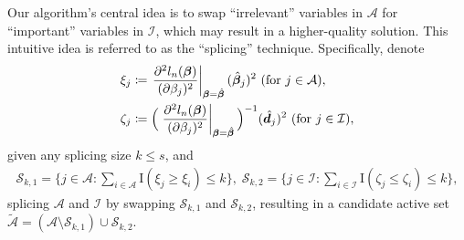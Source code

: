 Our algorithm's central idea is to swap ``irrelevant'' variables in $\mathcal{A}$ for
``important'' variables in $\mathcal{I}$, which may result in a higher-quality solution.
This intuitive idea is referred to as the ``splicing'' technique. Specifically, denote
\begin{equation}\label{eqn:approx_sacrifice}
\begin{split}
\xi_j & \coloneqq \left.\frac{\partial^2 l_n( \boldsymbol \beta )}{ (\partial \beta_{j})^2 }\right|_{\boldsymbol \beta = \hat{\boldsymbol \beta}} (\hat {\boldsymbol \beta}_j)^2 ~(\textup{for}~ j \in \mathcal{A}), \\
\zeta_j & \coloneqq \Big( \left.\frac{\partial^2 l_n( \boldsymbol \beta )}{ (\partial \beta_{j} )^2 }\right|_{\boldsymbol \beta = \hat{\boldsymbol \beta} } \Big)^{-1} ( \hat{\boldsymbol d}_j )^2 ~(\textup{for}~ j \in \mathcal{I}),
\end{split}
\end{equation}
given any splicing size $k\leq s$, and
\begin{equation}\label{eqn:splicing_set}
\begin{split}
\mathcal{S}_{k, 1}= \{j\in \mathcal{A}: \sum_{i \in \mathcal{A}} \mathrm{I}( \xi_j \geq \xi_i) \leq k\},
\;
\mathcal{S}_{k, 2}= \{j\in \mathcal{I}: \sum_{i \in \mathcal{I}} \mathrm{I}( \zeta_j\leq \zeta_i) \leq k\},
\end{split}
\end{equation}
splicing $\mathcal{A}$ and $\mathcal{I}$ by swapping $\mathcal{S}_{k, 1}$ and $\mathcal{S}_{k, 2}$, resulting in a candidate active set $\tilde{\mathcal{A}} = (\mathcal{A}\setminus \mathcal{S}_{k, 1}) \cup \mathcal{S}_{k, 2}$.
